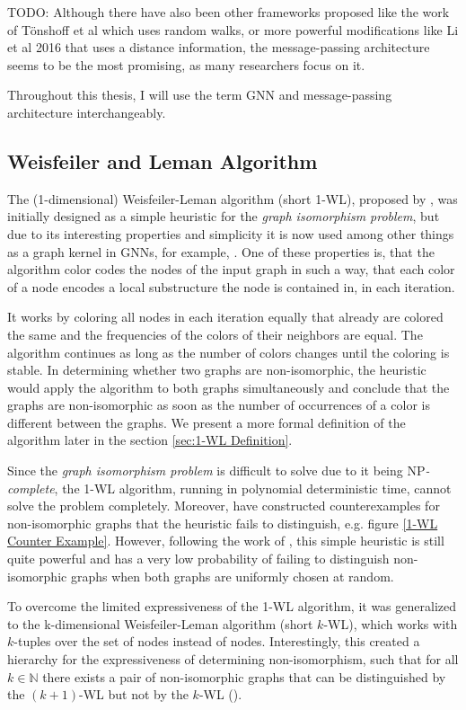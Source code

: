 \documentclass[11pt, dvipsnames, DIV=12]{scrreprt}
\theoremstyle{definition}
\begin{document}
TODO:
Although there have also been other frameworks proposed like the work of Tönshoff et al which uses random walks, or more powerful modifications like Li et al 2016 that uses a distance information, the message-passing architecture seems to be the most promising, as many researchers focus on it. 

Throughout this thesis, I will use the term GNN and message-passing architecture interchangeably.


\subsection{Weisfeiler and Leman Algorithm}
The (1-dimensional) Weisfeiler-Leman algorithm (short 1-WL), proposed by \cite{Wei+1968}, was initially designed as a simple heuristic for the \textit{graph isomorphism problem}, but due to its interesting properties and simplicity it is now used among other things as a graph kernel in GNNs, for example, \cite{She+2009b, She+2011}. One of these properties is, that the algorithm color codes the nodes of the input graph in such a way, that each color of a node encodes a local substructure the node is contained in, in each iteration.

It works by coloring all nodes in each iteration equally that already are colored the same and the frequencies of the colors of their neighbors are equal. The algorithm continues as long as the number of colors changes until the coloring is stable. In determining whether two graphs are non-isomorphic, the heuristic would apply the algorithm to both graphs simultaneously and conclude that the graphs are non-isomorphic as soon as the number of occurrences of a color is different between the graphs. We present a more formal definition of the algorithm later in the section \ref{sec:1-WL Definition}.

Since the \textit{graph isomorphism problem} is difficult to solve due to it being \textsf{NP}\textit{-complete}, the 1-WL algorithm, running in polynomial deterministic time, cannot solve the problem completely. Moreover, \cite{Cai1992} have constructed counterexamples for non-isomorphic graphs that the heuristic fails to distinguish, e.g. figure \ref{1-WL Counter Example}. However, following the work of \cite{Bab+1979}, this simple heuristic is still quite powerful and has a very low probability of failing to distinguish non-isomorphic graphs when both graphs are uniformly chosen at random.

To overcome the limited expressiveness of the 1-WL algorithm, it was generalized to the k-dimensional Weisfeiler-Leman algorithm (short $k$-WL), which works with $k$-tuples over the set of nodes instead of nodes. Interestingly, this created a hierarchy for the expressiveness of determining non-isomorphism, such that for all $k \in \mathbb{N}$ there exists a pair of non-isomorphic graphs that can be distinguished by the $(k+1)$-WL but not by the $k$-WL (\cite{Cai1992}).
\end{document}
